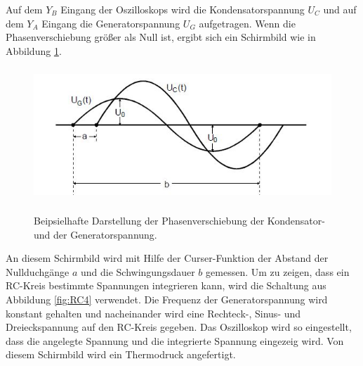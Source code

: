 \noindent Auf dem $Y_{B}$ Eingang der Oszilloskops wird die Kondensatorspannung $U_{C}$
und auf dem $Y_{A}$ Eingang die Generatorspannung $U_{G}$ aufgetragen.
Wenn die Phasenverschiebung größer als Null ist, ergibt sich ein Schirmbild wie in
Abbildung \ref{fig:phase1}.
\begin{figure}[H]
  \centering
  \includegraphics[height=5cm]{phase.JPG}
  \caption{Beipsielhafte Darstellung der Phasenverschiebung der Kondensator- und der Generatorspannung.}
  \cite{skript}
  \label{fig:phase1}
\end{figure}
\noindent An diesem Schirmbild wird mit Hilfe der Curser-Funktion der Abstand der Nullduchgänge $a$
und die Schwingungsdauer $b$ gemessen.
Um zu zeigen, dass ein RC-Kreis bestimmte Spannungen integrieren kann, wird die
Schaltung aus Abbildung \ref{fig:RC4} verwendet. Die Frequenz der Generatorspannung
wird konstant gehalten und nacheinander wird eine Rechteck-, Sinus- und Dreieckspannung
auf den RC-Kreis gegeben. Das Oszilloskop wird so eingestellt, dass die
angelegte Spannung und die integrierte Spannung eingezeig wird. Von diesem
Schirmbild wird ein Thermodruck angefertigt.
